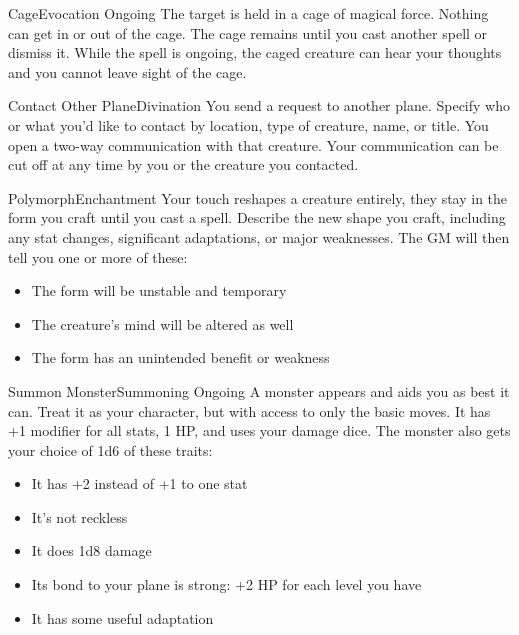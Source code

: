 \documentclass[8pt]{extarticle}
\begin{document}
\clearpage


\begin{multicols}{2}

  \begin{aspell}{Cage}{Evocation Ongoing}
    The target is held in a cage of magical force. Nothing can get in
    or out of the cage. The cage remains until you cast another spell
    or dismiss it. While the spell is ongoing, the caged creature can
    hear your thoughts and you cannot leave sight of the cage.
  \end{aspell}

  \begin{aspell}{Contact Other Plane}{Divination}
    You send a request to another plane. Specify who or what you’d
    like to contact by location, type of creature, name, or title. You
    open a two-way communication with that creature. Your
    communication can be cut off at any time by you or the creature
    you contacted.
  \end{aspell}

  \begin{aspell}{Polymorph}{Enchantment}
    Your touch reshapes a creature entirely, they stay in the form you
    craft until you cast a spell. Describe the new shape you craft,
    including any stat changes, significant adaptations, or major
    weaknesses. The GM will then tell you one or more of these:
    \begin{itemize}
    \item The form will be unstable and temporary
    \item The creature’s mind will be altered as well
    \item The form has an unintended benefit or weakness
    \end{itemize}
  \end{aspell}

  \vfill\null
  \columnbreak

  \begin{aspell}{Summon Monster}{Summoning Ongoing}
    A monster appears and aids you as best it can. Treat it as your
    character, but with access to only the basic moves. It has +1
    modifier for all stats, 1 HP, and uses your damage dice. The
    monster also gets your choice of 1d6 of these traits:
    \begin{itemize}
    \item It has +2 instead of +1 to one stat
    \item It’s not reckless
    \item It does 1d8 damage
    \item Its bond to your plane is strong: +2 HP for each level you have
    \item It has some useful adaptation
    \end{itemize}


\end{aspell}
\end{multicols}
\end{document}
